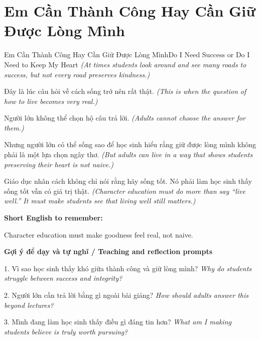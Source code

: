 \section{Em Cần Thành Công Hay Cần Giữ Được Lòng Mình}
\begin{truyen}{Em Cần Thành Công Hay Cần Giữ Được Lòng Mình}{Do I Need Success or Do I Need to Keep My Heart}
\textit{(At times students look around and see many roads to success, but not every road preserves kindness.)}

Đây là lúc câu hỏi về cách sống trở nên rất thật.
\textit{(This is when the question of how to live becomes very real.)}

Người lớn không thể chọn hộ câu trả lời.
\textit{(Adults cannot choose the answer for them.)}

Nhưng người lớn có thể sống sao để học sinh hiểu rằng giữ được lòng mình không phải là một lựa chọn ngây thơ.
\textit{(But adults can live in a way that shows students preserving their heart is not naive.)}

\end{truyen}

\begin{baihoc}
Giáo dục nhân cách không chỉ nói rằng hãy sống tốt. Nó phải làm học sinh thấy sống tốt vẫn có giá trị thật.
\textit{(Character education must do more than say “live well.” It must make students see that living well still matters.)}
\end{baihoc}

\begin{ghinhoanh}
\textbf{Short English to remember:}

Character education must make goodness feel real, not naive.

\end{ghinhoanh}

\begin{tuhocnhanh}
\textbf{Gợi ý để dạy và tự nghĩ / Teaching and reflection prompts}

1. Vì sao học sinh thấy khó giữa thành công và giữ lòng mình? \textit{Why do students struggle between success and integrity?}

2. Người lớn cần trả lời bằng gì ngoài bài giảng? \textit{How should adults answer this beyond lectures?}

3. Mình đang làm học sinh thấy điều gì đáng tin hơn? \textit{What am I making students believe is truly worth pursuing?}
\end{tuhocnhanh}
\ngancach

